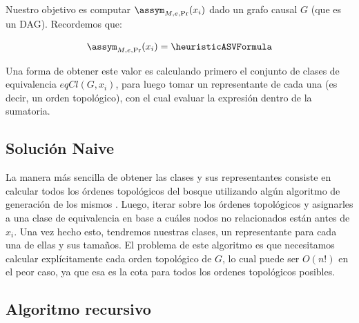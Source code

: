 Nuestro objetivo es computar $\assym_{M,e,\Pr}(x_i)$ dado un grafo causal $G$ (que es un DAG). Recordemos que:

$$\assym_{M,e,\Pr}(x_i) = \heuristicASVFormula$$


Una forma de obtener este valor es calculando primero el conjunto de clases de equivalencia $eqCl(G, x_i)$, para luego tomar un representante de cada una (es decir, un orden topológico), con el cual evaluar la expresión dentro de la sumatoria. 

\subsection{Solución Naive} \label{alg:naiveAlgorithmEquivalenceClass}


La manera más sencilla de obtener las clases y sus representantes consiste en calcular todos los órdenes topológicos del bosque utilizando algún algoritmo de generación de los mismos \cite{algorithmForAllTopoSorts}. Luego, iterar sobre los órdenes topológicos y asignarles a una clase de equivalencia en base a cuáles nodos no relacionados están antes de $x_i$. Una vez hecho esto, tendremos nuestras clases, un representante para cada una de ellas y sus tamaños. El problema de este algoritmo es que necesitamos calcular explícitamente cada orden topológico de $G$, lo cual puede ser $O(n!)$ en el peor caso, ya que esa es la cota para todos los ordenes topológicos posibles.

\subsection{Algoritmo recursivo}


